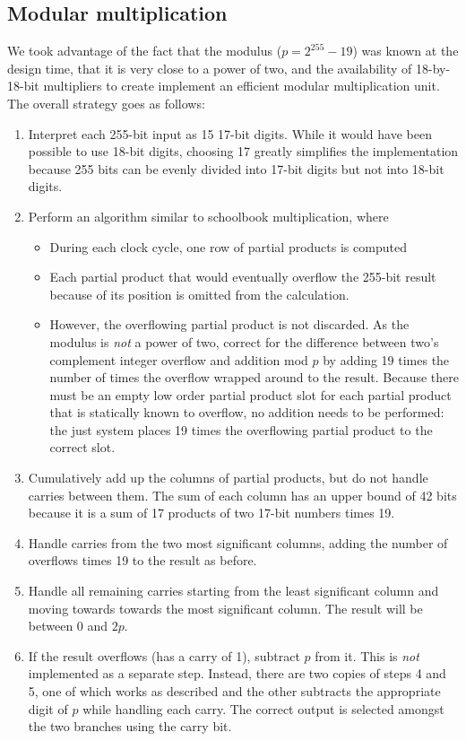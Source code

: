 \subsection{Modular multiplication}\label{modular-multiplication}

We took advantage of the fact that the modulus (\(p=2^{255}-19\)) was
known at the design time, that it is very close to a power of two, and
the availability of 18-by-18-bit multipliers to create implement an
efficient modular multiplication unit. The overall strategy goes as
follows:

\begin{enumerate}
\def\labelenumi{\arabic{enumi}.}
\itemsep1pt\parskip0pt
\item
  Interpret each 255-bit input as 15 17-bit digits. While it would have
  been possible to use 18-bit digits, choosing 17 greatly simplifies the
  implementation because 255 bits can be evenly divided into 17-bit
  digits but not into 18-bit digits.
\item
  Perform an algorithm similar to schoolbook multiplication, where

  \begin{itemize}
  \itemsep1pt\parskip0pt
  \item
    During each clock cycle, one row of partial products is computed
  \item
    Each partial product that would eventually overflow the 255-bit
    result because of its position is omitted from the calculation.
  \item
    However, the overflowing partial product is not discarded. As the
    modulus is \emph{not} a power of two, correct for the difference
    between two's complement integer overflow and addition mod \(p\) by
    adding 19 times the number of times the overflow wrapped around to
    the result. Because there must be an empty low order partial product
    slot for each partial product that is statically known to overflow,
    no addition needs to be performed: the just system places 19 times
    the overflowing partial product to the correct slot.
  \end{itemize}
\item
  Cumulatively add up the columns of partial products, but do not handle
  carries between them. The sum of each column has an upper bound of 42
  bits because it is a sum of 17 products of two 17-bit numbers times
  19.
\item
  Handle carries from the two most significant columns, adding the
  number of overflows times 19 to the result as before.
\item
  Handle all remaining carries starting from the least significant
  column and moving towards towards the most significant column. The
  result will be between \(0\) and \(2p\).
\item
  If the result overflows (has a carry of 1), subtract \(p\) from it.
  This is \emph{not} implemented as a separate step. Instead, there are
  two copies of steps 4 and 5, one of which works as described and the
  other subtracts the appropriate digit of \(p\) while handling each
  carry. The correct output is selected amongst the two branches using
  the carry bit.
\end{enumerate}

